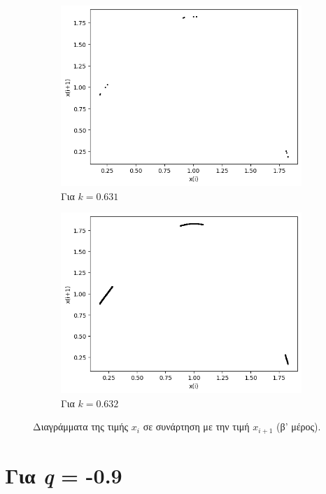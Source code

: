 \begin{figure}[ht]
\begin{subfigure}[b]{0.4\textwidth}
		\includegraphics[width=\textwidth]{LateX images/graphs q07/g12}
		\caption{Για $k=0.631$}
		\label{f:k46}
	\end{subfigure}
	\hfill
	\begin{subfigure}[b]{0.4\textwidth}
		\centering
		\includegraphics[width=\textwidth]{LateX images/graphs q07/g13}
		\caption{Για $k=0.632$}
		\label{f:k47}
	\end{subfigure}
	\caption{Διαγράμματα της τιμής \(x_i\) σε συνάρτηση με την τιμή \(x_{i+1}\) (β' μέρος).}	
\end{figure}

\clearpage

\section{Για \emph{q} = -0.9}

